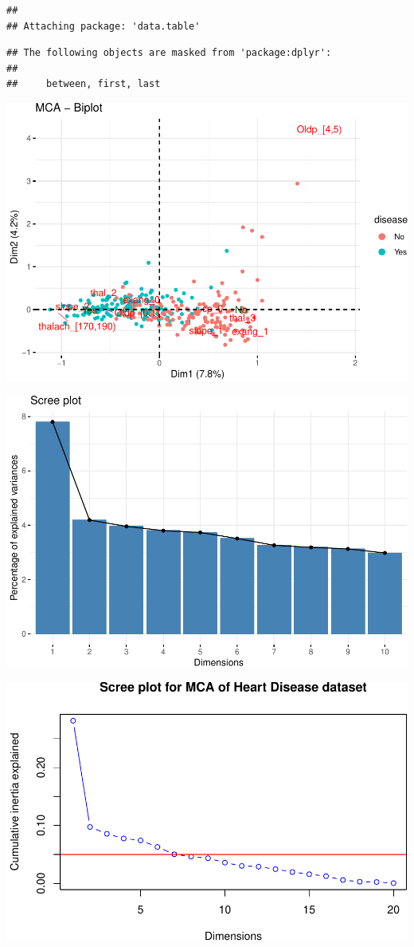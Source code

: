 \documentclass[]{article}
\begin{document}
\begin{verbatim}
## 
## Attaching package: 'data.table'
\end{verbatim}

\begin{verbatim}
## The following objects are masked from 'package:dplyr':
## 
##     between, first, last
\end{verbatim}

\includegraphics{project_report_files/figure-latex/unnamed-chunk-24-1.pdf}

\includegraphics{project_report_files/figure-latex/unnamed-chunk-25-1.pdf}

\includegraphics{project_report_files/figure-latex/unnamed-chunk-26-1.pdf}
\end{document}
